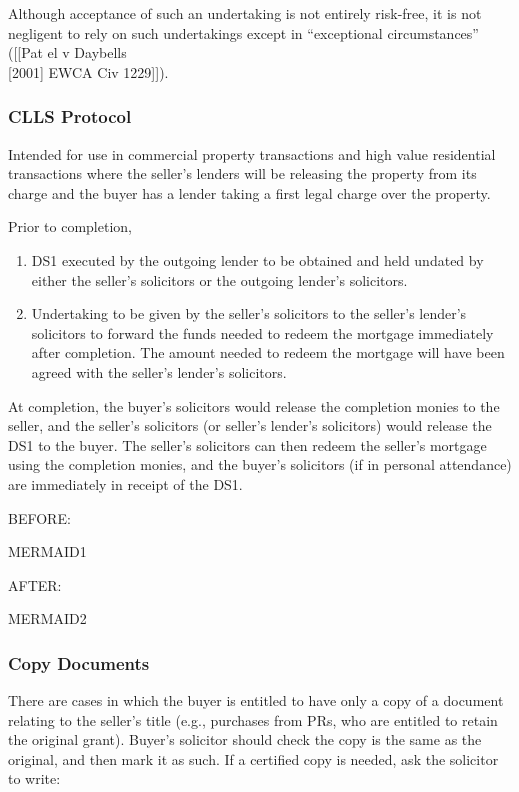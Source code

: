 \documentclass[
]{article}
\providecommand{\tightlist}{%
  \setlength{\itemsep}{0pt}\setlength{\parskip}{0pt}}
\begin{document}
Although acceptance of such an undertaking is not entirely risk-free, it
is not negligent to rely on such undertakings except in ``exceptional
circumstances'' ({[}{[}Pat el v Daybells\\
{[}2001{]} EWCA Civ 1229{]}{]}).

\hypertarget{clls-protocol}{%
\subsubsection{CLLS Protocol}\label{clls-protocol}}

Intended for use in commercial property transactions and high value
residential transactions where the seller's lenders will be releasing
the property from its charge and the buyer has a lender taking a first
legal charge over the property.

Prior to completion,

\begin{enumerate}
\def\labelenumi{\arabic{enumi}.}
\tightlist
\item
  DS1 executed by the outgoing lender to be obtained and held undated by
  either the seller's solicitors or the outgoing lender's solicitors.
\item
  Undertaking to be given by the seller's solicitors to the seller's
  lender's solicitors to forward the funds needed to redeem the mortgage
  immediately after completion. The amount needed to redeem the mortgage
  will have been agreed with the seller's lender's solicitors.
\end{enumerate}

At completion, the buyer's solicitors would release the completion
monies to the seller, and the seller's solicitors (or seller's lender's
solicitors) would release the DS1 to the buyer. The seller's solicitors
can then redeem the seller's mortgage using the completion monies, and
the buyer's solicitors (if in personal attendance) are immediately in
receipt of the DS1.

BEFORE:

MERMAID1

AFTER:

MERMAID2

\hypertarget{copy-documents}{%
\subsubsection{Copy Documents}\label{copy-documents}}

There are cases in which the buyer is entitled to have only a copy of a
document relating to the seller's title (e.g., purchases from PRs, who
are entitled to retain the original grant). Buyer's solicitor should
check the copy is the same as the original, and then mark it as such. If
a certified copy is needed, ask the solicitor to write:
\end{document}
